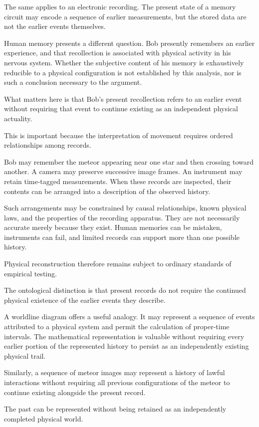 \documentclass[12pt,onecolumn]{article}
\begin{document}
The same applies to an electronic recording. The present state of a memory circuit may encode a sequence of earlier measurements, but the stored data are not the earlier events themselves.

Human memory presents a different question. Bob presently remembers an earlier experience, and that recollection is associated with physical activity in his nervous system. Whether the subjective content of his memory is exhaustively reducible to a physical configuration is not established by this analysis, nor is such a conclusion necessary to the argument.

What matters here is that Bob's present recollection refers to an earlier event without requiring that event to continue existing as an independent physical actuality.

This is important because the interpretation of movement requires ordered relationships among records.

Bob may remember the meteor appearing near one star and then crossing toward another. A camera may preserve successive image frames. An instrument may retain time-tagged measurements. When these records are inspected, their contents can be arranged into a description of the observed history.

Such arrangements may be constrained by causal relationships, known physical laws, and the properties of the recording apparatus. They are not necessarily accurate merely because they exist. Human memories can be mistaken, instruments can fail, and limited records can support more than one possible history.

Physical reconstruction therefore remains subject to ordinary standards of empirical testing.

The ontological distinction is that present records do not require the continued physical existence of the earlier events they describe.

A worldline diagram offers a useful analogy. It may represent a sequence of events attributed to a physical system and permit the calculation of proper-time intervals. The mathematical representation is valuable without requiring every earlier portion of the represented history to persist as an independently existing physical trail.

Similarly, a sequence of meteor images may represent a history of lawful interactions without requiring all previous configurations of the meteor to continue existing alongside the present record.

The past can be represented without being retained as an independently completed physical world.
\end{document}
